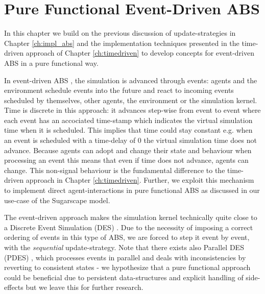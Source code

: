 \chapter{Pure Functional Event-Driven ABS}
\label{ch:eventdriven}

In this chapter we build on the previous discussion of update-strategies in Chapter \ref{ch:impl_abs} and the implementation techniques presented in the time-driven approach of Chapter \ref{ch:timedriven} to develop concepts for event-driven ABS in a pure functional way. 

In event-driven ABS \cite{meyer_event-driven_2014}, the simulation is advanced through events: agents and the environment schedule events into the future and react to incoming events scheduled by themselves, other agents, the environment or the simulation kernel. Time is discrete in this approach: it advances step-wise from event to event where each event has an accociated time-stamp which indicates the virtual simulation time when it is scheduled. This implies that time could stay constant e.g. when an event is scheduled with a time-delay of 0 the virtual simulation time does not advance. Because agents can adopt and change their state and behaviour when processing an event this means that even if time does not advance, agents can change. This non-signal behaviour is the fundamental difference to the time-driven approach in Chapter \ref{ch:timedriven}. Further, we exploit this mechanism to implement direct agent-interactions in pure functional ABS as discussed in our use-case of the Sugarscape model.

The event-driven approach makes the simulation kernel technically quite close to a Discrete Event Simulation (DES) \cite{zeigler_theory_2000}. Due to the necessity of imposing a correct ordering of events in this type of ABS, we are forced to step it event by event, with the \textit{sequential} update-strategy. Note that there exists also Parallel DES (PDES) \cite{fujimoto_parallel_1990}, which processes events in parallel and deals with inconsistencies by reverting to consistent states - we hypothesize that a pure functional approach could be beneficial due to persistent data-structures and explicit handling of side-effects but we leave this for further research.

